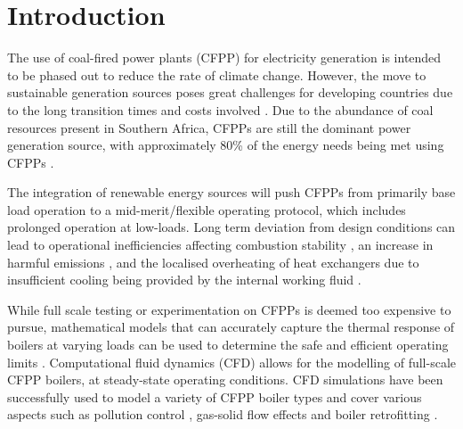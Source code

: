 \documentclass[twocolumn,10pt]{asme2ej}
\begin{document}
\begin{nomenclature}
\end{nomenclature}
\section{Introduction}
The use of coal-fired power plants (CFPP) for electricity generation is intended to be phased out to reduce the rate of climate change. However, the move to sustainable generation sources poses great challenges for developing countries due to the long transition times and costs involved \cite{ugum2019}. Due to the abundance of coal resources present in Southern Africa, CFPPs are still the dominant power generation source, with approximately 80\% of the energy needs being met using CFPPs \cite{eskom}.

The integration of renewable energy sources will push CFPPs from primarily base load operation to a mid-merit/flexible operating protocol, which includes prolonged operation at low-loads. Long term deviation from design conditions can lead to operational inefficiencies affecting combustion stability \cite{Hernik2020}, an increase in harmful emissions \cite{Chang2021}, and the localised overheating of heat exchangers due to insufficient cooling being provided by the internal working fluid \cite{Modlinski2019}.

While full scale testing or experimentation on CFPPs is deemed too expensive to pursue, mathematical models that can accurately capture the thermal response of boilers at varying loads can be used to determine the safe and efficient operating limits \cite{Laubscher2019b}. Computational fluid dynamics (CFD) allows for the modelling of full-scale CFPP boilers, at steady-state operating conditions. CFD simulations have been successfully used to model a variety of CFPP boiler types \cite{Laubscher2019a, Gu2020} and cover various aspects such as pollution control \cite{Du2017, Fan2001}, gas-solid flow effects \cite{Chen2017} and boiler retrofitting \cite{Gu2020, He2007}.
\end{document}
